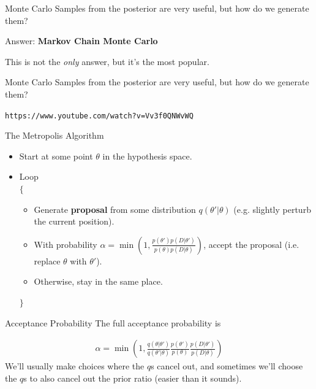 \begin{frame}[t]{Monte Carlo}
Samples from the posterior are very useful, but how do we generate them?

\begin{center}
Answer: {\bf Markov Chain Monte Carlo}
\end{center}

This is not the {\it only} answer, but it's the most popular.
\end{frame}

\begin{frame}[t]{Monte Carlo}
Samples from the posterior are very useful, but how do we generate them?

\begin{center}
{\tt https://www.youtube.com/watch?v=Vv3f0QNWvWQ}
\end{center}

\end{frame}




\begin{frame}[t]{The Metropolis Algorithm}

\begin{itemize}
\item Start at some point $\theta$ in the hypothesis space.
\item Loop\\
$\{$
  \begin{itemize}
  \item Generate {\bf proposal} from some distribution $q(\theta' | \theta)$
  (e.g. slightly perturb the current position).
  \item With probability $\alpha = \min\left(1, \frac{p(\theta')p(D|\theta')}{p(\theta)p(D|\theta)}\right)$, accept the proposal (i.e. replace $\theta$ with $\theta'$).
  \item Otherwise, stay in the same place.
  \end{itemize}
$\}$
\end{itemize}
\end{frame}

\begin{frame}[t]{Acceptance Probability}
The full acceptance probability is

\begin{eqnarray}
\alpha =
\min\left(1, \frac{q(\theta|\theta')}{q(\theta'|\theta)}\frac{p(\theta')}{p(\theta)}\frac{p(D|\theta')}{p(D|\theta)}\right)
\end{eqnarray}
We'll usually make choices where the $q$s cancel out, and sometimes we'll
choose the $q$s to also cancel out the prior ratio (easier than it sounds).
\end{frame}



